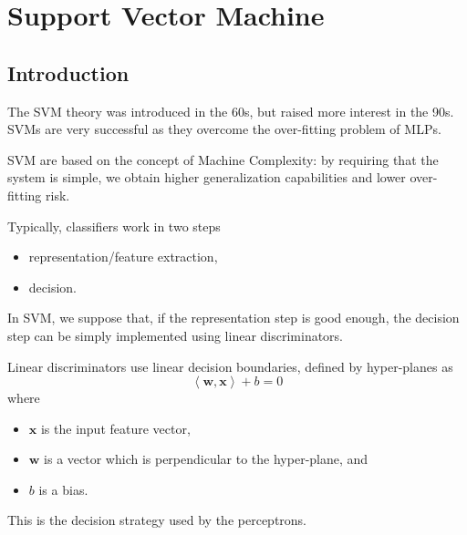 \documentclass[oneside,onecolumn]{report}
\newcommand{\inp}[2]{\left\langle #1, #2 \right\rangle}
\begin{document}
\chapter{Support Vector Machine}
\section{Introduction}
The SVM theory was introduced in the 60s, but raised more interest in the 90s.
SVMs are very successful as they overcome the over-fitting problem of MLPs.

SVM are based on the concept of Machine Complexity: by requiring that the system is simple, we obtain higher generalization capabilities and lower over-fitting risk.

Typically, classifiers work in two steps
\begin{itemize}
    \item representation/feature extraction,
    \item decision.
\end{itemize}
In SVM, we suppose that, if the representation step is good enough, the decision step can be simply implemented using linear discriminators.

Linear discriminators use linear decision boundaries, defined by hyper-planes as
$$ \inp{\bm w}{\bm x} + b = 0 $$
where
\begin{itemize}
    \item $\bm x$ is the input feature vector,
    \item $\bm w$ is a vector which is perpendicular to the hyper-plane, and
    \item $b$ is a bias.
\end{itemize}

This is the decision strategy used by the perceptrons.
\end{document}
